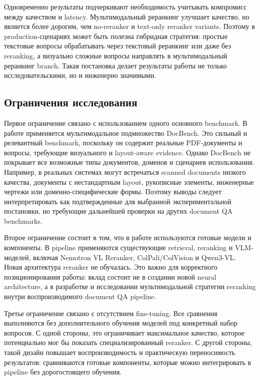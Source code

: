 \documentclass[conference]{IEEEtran}
\begin{document}
Одновременно результаты подчеркивают необходимость учитывать компромисс между качеством и latency. Мультимодальный реранкинг улучшает качество, но является более дорогим, чем no-reranker и text-only reranker variants. Поэтому в production-сценариях может быть полезна гибридная стратегия: простые текстовые вопросы обрабатывать через текстовый реранкинг или даже без reranking, а визуально сложные вопросы направлять в мультимодальный реранкинг branch. Такая постановка делает результаты работы не только исследовательскими, но и инженерно значимыми.

\subsection{Ограничения исследования}

Первое ограничение связано с использованием одного основного benchmark. В работе применяется мультимодальное подмножество DocBench. Это сильный и релевантный benchmark, поскольку он содержит реальные PDF-документы и вопросы, требующие визуального и layout-aware evidence. Однако DocBench не покрывает все возможные типы документов, доменов и сценариев использования. Например, в реальных системах могут встречаться scanned documents низкого качества, документы с нестандартным layout, рукописные элементы, инженерные чертежи или доменно-специфические формы. Поэтому выводы следует интерпретировать как подтвержденные для выбранной экспериментальной постановки, но требующие дальнейшей проверки на других document QA benchmarks.

Второе ограничение состоит в том, что в работе используются готовые модели и компоненты. В pipeline применяются существующие retrieval, reranking и VLM-моделей, включая Nemotron VL Reranker, ColPali/ColVision и Qwen3-VL. Новая архитектура reranker не обучалась. Это важно для корректного позиционирования работы: вклад состоит не в создании новой neural architecture, а в разработке и исследовании мультимодальной стратегии reranking внутри воспроизводимого document QA pipeline.

Третье ограничение связано с отсутствием fine-tuning. Все сравнения выполняются без дополнительного обучения моделей под конкретный набор вопросов. С одной стороны, это ограничивает максимальное качество, которое потенциально мог бы показать специализированный reranker. С другой стороны, такой дизайн повышает воспроизводимость и практическую переносимость результатов: сравниваются готовые компоненты, которые можно интегрировать в pipeline без дорогостоящего обучения.
\end{document}
